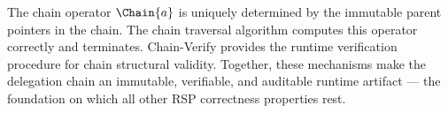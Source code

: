 The chain operator $\Chain{a}$ is uniquely determined by the immutable parent pointers in the chain. The chain traversal algorithm computes this operator correctly and terminates. Chain-Verify provides the runtime verification procedure for chain structural validity. Together, these mechanisms make the delegation chain an immutable, verifiable, and auditable runtime artifact --- the foundation on which all other RSP correctness properties rest.
